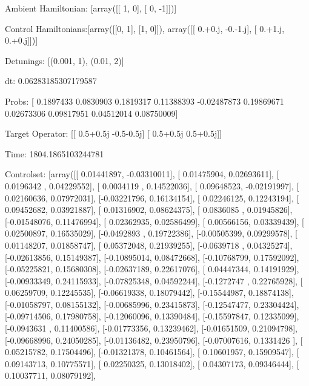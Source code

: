 \documentclass{article}
\begin{document}
    

\newpage

Ambient Hamiltonian: [array([[ 1,  0],
       [ 0, -1]])]

Control Hamiltonians:[array([[0, 1],
       [1, 0]]), array([[ 0.+0.j, -0.-1.j],
       [ 0.+1.j,  0.+0.j]])]

Detunings: [(0.001, 1), (0.01, 2)]

 dt: 0.06283185307179587

Probs: [ 0.1897433   0.0830903   0.1819317   0.11388393 -0.02487873  0.19869671
  0.02673306  0.09817951  0.04512014  0.08750009]

Target Operator: [[ 0.5+0.5j -0.5-0.5j]
 [ 0.5+0.5j  0.5+0.5j]]

Time: 1804.1865103244781

Controlset: [array([[ 0.01441897, -0.03310011],
       [ 0.01475904,  0.02693611],
       [ 0.0196342 ,  0.04229552],
       [ 0.0034119 ,  0.14522036],
       [ 0.09648523, -0.02191997],
       [ 0.02160636,  0.07972031],
       [-0.03221796,  0.16134154],
       [ 0.02246125,  0.12243194],
       [ 0.09452682,  0.03921887],
       [ 0.01316902,  0.08624375],
       [ 0.0836085 ,  0.01945826],
       [-0.01548076,  0.11476994],
       [ 0.02362935,  0.02586499],
       [ 0.00566156,  0.03339439],
       [ 0.02500897,  0.16535029],
       [-0.0492893 ,  0.19722386],
       [-0.00505399,  0.09299578],
       [ 0.01148207,  0.01858747],
       [ 0.05372048,  0.21939255],
       [-0.0639718 ,  0.04325274],
       [-0.02613856,  0.15149387],
       [-0.10895014,  0.08472668],
       [-0.10768799,  0.17592092],
       [-0.05225821,  0.15680308],
       [-0.02637189,  0.22617076],
       [ 0.04447344,  0.14191929],
       [-0.00933349,  0.24115933],
       [-0.07825348,  0.04592244],
       [-0.1272747 ,  0.22765928],
       [ 0.06259709,  0.12245535],
       [-0.06619338,  0.18079442],
       [-0.15544987,  0.18874138],
       [-0.01058797,  0.08155132],
       [-0.00685996,  0.23415873],
       [-0.12547477,  0.23304424],
       [-0.09714506,  0.17980758],
       [-0.12060096,  0.13390484],
       [-0.15597847,  0.12335099],
       [-0.0943631 ,  0.11400586],
       [-0.01773356,  0.13239462],
       [-0.01651509,  0.21094798],
       [-0.09668996,  0.24050285],
       [-0.01136482,  0.23950796],
       [-0.07007616,  0.1331426 ],
       [ 0.05215782,  0.17504496],
       [-0.01321378,  0.10461564],
       [ 0.10601957,  0.15909547],
       [ 0.09143713,  0.10775571],
       [ 0.02250325,  0.13018402],
       [ 0.04307173,  0.09346444],
       [ 0.10037711,  0.08079192],
\end{document}
